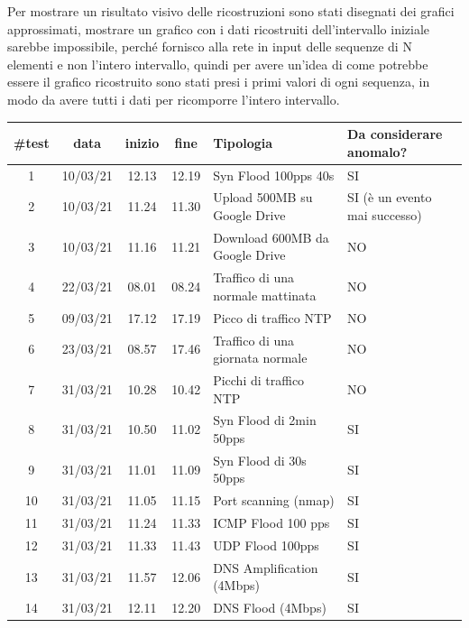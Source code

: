 Per mostrare un risultato visivo delle ricostruzioni sono stati disegnati dei grafici approssimati, mostrare un grafico con i dati ricostruiti dell'intervallo iniziale sarebbe impossibile, perché fornisco alla rete in input delle sequenze di N elementi e non l'intero intervallo, quindi per avere un'idea di come potrebbe essere il grafico ricostruito sono stati presi i primi valori di ogni sequenza, in modo da avere tutti i dati per ricomporre l'intero intervallo.
\begin{table}
    \begin{tabularx}{\textwidth}{||c c c c X X||} 
        \hline
        \#test & data  & inizio & fine & Tipologia & Da considerare anomalo? \\ [0.5ex] 
        \hline\hline
        1 & 10/03/21 & 12.13 & 12.19 & Syn Flood 100pps 40s & SI\\ 
        \hline
        2 & 10/03/21 & 11.24 & 11.30
         & Upload 500MB su Google Drive & SI (è un evento mai successo)\\ 
        \hline
        3 & 10/03/21 & 11.16 & 11.21 & Download 600MB da Google Drive & NO\\ 
        \hline 
        4 & 22/03/21 & 08.01 & 08.24 & Traffico di una normale mattinata & NO\\
        \hline
        5 & 09/03/21 & 17.12 & 17.19 & Picco di traffico NTP & NO\\
        \hline
        6 & 23/03/21 & 08.57 & 17.46
         & Traffico di una giornata normale & NO\\ 
        \hline
        7 & 31/03/21 & 10.28 & 10.42 & Picchi di traffico NTP & NO\\ 
        \hline 
        8 & 31/03/21 & 10.50 & 11.02 & Syn Flood di 2min 50pps & SI\\
        \hline
        9 & 31/03/21 & 11.01 & 11.09 & Syn Flood di 30s 50pps & SI\\        
        \hline
        10 & 31/03/21 & 11.05 & 11.15 & Port scanning (nmap) & SI\\
        \hline
        11 & 31/03/21 & 11.24 & 11.33 & ICMP Flood 100 pps & SI\\
        \hline
        12 & 31/03/21 & 11.33 & 11.43
         & UDP Flood 100pps & SI\\ 
        \hline
        13 & 31/03/21 & 11.57 & 12.06 & DNS Amplification (4Mbps) & SI\\ 
        \hline 
        14 & 31/03/21 & 12.11 & 12.20 & DNS Flood (4Mbps) & SI\\
        \hline

\end{tabularx}
\end{table}
